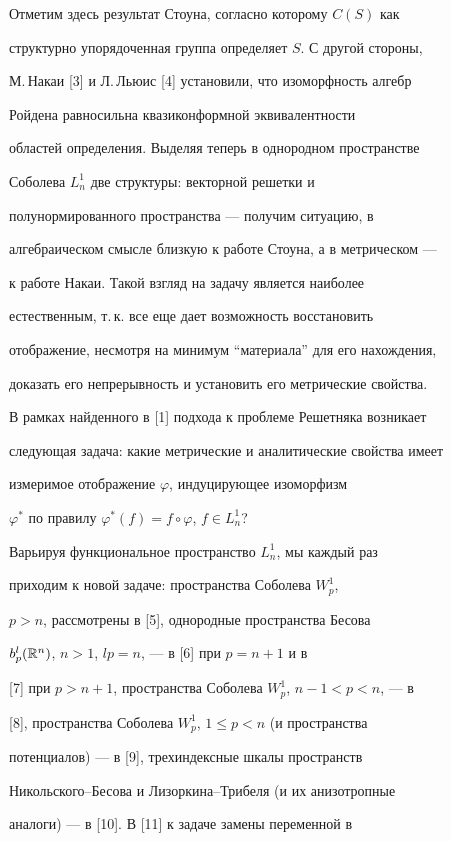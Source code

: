 Отметим здесь результат Стоуна, согласно которому $C(S)$ как


структурно упорядоченная группа определяет $S$. С другой стороны,


М.\,Накаи [3] и Л.\,Льюис [4] установили, что изоморфность алгебр


Ройдена равносильна квазиконформной эквивалентности


областей определения. Выделяя теперь в однородном пространстве


Соболева $L^1_n$ две структуры: векторной решетки и


полунормированного пространства --- получим ситуацию, в


алгебраическом смысле близкую к работе Стоуна, а в метрическом ---


к работе Накаи. Такой взгляд на задачу является наиболее


естественным, т.\,к. все еще дает возможность восстановить


отображение, несмотря на минимум ``материала'' для его нахождения,


доказать его непрерывность и установить его метрические свойства.





В рамках найденного в [1] подхода к проблеме Решетняка возникает


следующая задача: какие метрические и аналитические свойства имеет


измеримое отображение $\varphi$, индуцирующее изоморфизм


$\varphi^*$ по правилу $\varphi^*(f)=f\circ\varphi$, $f\in L_n^1$?


Варьируя функциональное пространство $L_n^1$, мы каждый раз


приходим к новой задаче: пространства Соболева $W^1_p$,


$p>n$, рассмотрены в [5], однородные пространства Бесова


$b^{l}_{p}({\Bbb R}^n)$, $n>1$, $lp=n$, --- в [6] при $p=n+1$ и в


[7] при $p>n+1$, пространства Соболева $W^1_p$, $n-1<p<n$, --- в


[8], пространства Соболева $W^1_p$, $1\leq p<n$ (и пространства


потенциалов) --- в [9], трехиндексные шкалы пространств


Никольского--Бесова и Лизоркина--Трибеля (и их анизотропные


аналоги) --- в [10]. В [11] к задаче замены переменной в


